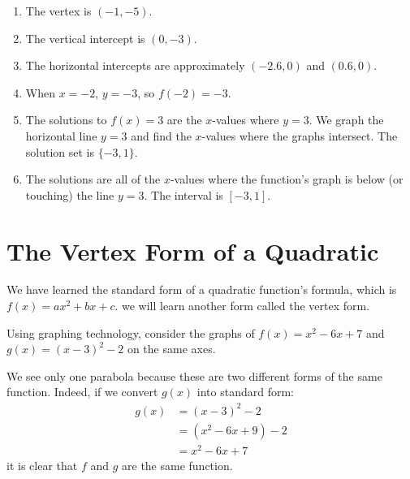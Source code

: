 \documentclass{ximera}
\begin{document}
\begin{example}
\begin{explanation}
\begin{image}
   \end{image}
\begin{enumerate}
                \item The vertex is $(-1,-5)$.
                \item The vertical intercept is $(0,-3)$.
                \item The horizontal intercepts are approximately $(-2.6,0)$ and $(0.6,0)$.
              \item  When $x=-2$, $y=-3$, so $f(-2)=-3$.
 	 \item The solutions to $f(x)=3$ are the $x$-values where $y=3$. We graph the horizontal line $y=3$ and find the $x$-values where the graphs intersect. The solution set is $\{-3,1\}$.
       	\item  The solutions are all of the $x$-values where the function's graph is below (or touching) the line $y=3$. The interval is $[-3,1]$.
\end{enumerate}
\end{explanation}
\end{example}
\section{The Vertex Form of a Quadratic}

      We have learned the standard form of a quadratic function's formula, which is $f(x)=ax^2+bx+c$.
      we will learn another form called the vertex form.

      Using graphing technology, consider the graphs of $f(x)=x^2-6x+7$ and $g(x)=(x-3)^2-2$ on the same axes.

        We see only one parabola because these are two different forms of the same function.
        Indeed, if we convert $g(x)$ into standard form:
	\begin{align*}
		g(x)&=(x-3)^2-2\\
			&=(x^2-6x+9)-2\\
			&=x^2-6x+7
	\end{align*}
        it is clear that $f$ and $g$ are the same function.
 
\end{document}
